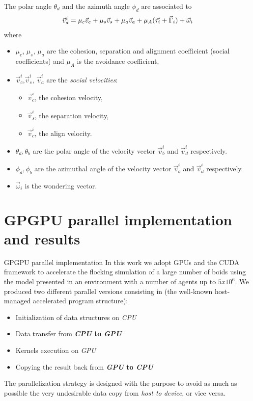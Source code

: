 \documentclass{beamer}
\begin{document}
\begin{frame}
The polar angle $\theta_d$ and the azimuth angle $\phi_d$ are associated to 
\begin{equation}
 \vec{v}_d^i = \mu_c \vec{v}_c + \mu_s\vec{v}_s + \mu_a \vec{v}_a + \mu_{A} (
\vec{{\tau}_i} + \vec{\Gamma}_i ) + \vec{\omega}_i \notag
\end{equation}
 where

\begin{itemize}
	\item $\mu_c$, $\mu_s$, $\mu_a$ are the cohesion, separation and alignment coefficient (social coefficients) and $\mu_A$ is the avoidance coefficient,

\item  $\vec{v}^i_c$,$\vec{v}^i_s$, $\vec{v}^i_a$ are the  \textit{social velocities}: 
    \begin{itemize}
    \item $\vec{v}^i_c$, the cohesion velocity,
    \item $\vec{v}^i_s$, the separation velocity, 
    \item  $\vec{v}^i_c$, the align velocity.

    \end{itemize}
    
\item  $\theta_d,\theta_b$ are the polar angle of the velocity vector
  $\vec{v}^i_b$ and $\vec{v}^i_d$ respectively.
\item $\phi_d,\phi_b$ are the azimuthal angle of the velocity vector
  $\vec{v}^i_b$ and $\vec{v}^i_d$ respectively.
  \item $\vec{\omega}_i$ is the wondering vector.
\end{itemize}
\end{frame}


\section{GPGPU parallel implementation and results}
\begin{frame}{GPGPU parallel implementation }
In this work we adopt GPUs and the CUDA framework to
accelerate the flocking simulation of a large number of boids
using the model presented  in an environment
with a number of agents up to $5x10^6$. 
We produced two different parallel
versions consisting in (the well-known host-managed accelerated
program structure):
\begin{itemize}
	\item Initialization of data structures on \emph{CPU}
	\item Data transfer from \textbf{\emph{CPU} to \emph{GPU}}
	\item Kernels execution on \emph{GPU}
	\item Copying the result back from \textbf{\emph{GPU} to \emph{CPU}}
\end{itemize}
The parallelization strategy is designed with the purpose to avoid as much
as possible the very undesirable data copy from \emph{host to device}, or vice versa.

\end{frame}
\end{document}
